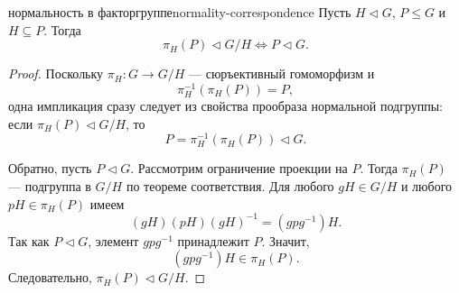 \begin{Statement}{нормальность в факторгруппе}{normality-correspondence}
	Пусть $H\triangleleft G$, $P\le G$ и $H\subseteq P$. Тогда
	\[
	\pi_H(P) \triangleleft G/H \Longleftrightarrow P \triangleleft G.
	\]
\end{Statement}

\begin{proof}
	Поскольку $\pi_H\colon G\to G/H$ --- сюръективный гомоморфизм и
	\[
	\pi_H^{-1}(\pi_H(P))=P,
	\]
	одна импликация сразу следует из свойства прообраза нормальной подгруппы:
	если $\pi_H(P)\triangleleft G/H$, то
	\[
	P=\pi_H^{-1}(\pi_H(P))\triangleleft G.
	\]
	
	Обратно, пусть $P\triangleleft G$. Рассмотрим ограничение проекции на $P$. Тогда $\pi_H(P)$ --- подгруппа в $G/H$ по теореме соответствия. Для любого $gH\in G/H$ и любого $pH\in \pi_H(P)$ имеем
	\[
	(gH)(pH)(gH)^{-1}=(gpg^{-1})H.
	\]
	Так как $P\triangleleft G$, элемент $gpg^{-1}$ принадлежит $P$. Значит,
	\[
	(gpg^{-1})H\in \pi_H(P).
	\]
	Следовательно, $\pi_H(P)\triangleleft G/H$.
\end{proof}